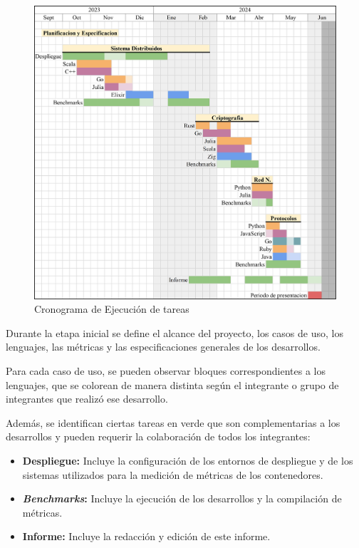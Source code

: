 \documentclass[11pt]{article}
\newcommand{\english}[1]{\textit{#1}}
\begin{document}
\begin{figure}
    \centering
    \includegraphics[width=\textwidth]{resources/cronograma.jpg}
    \caption{Cronograma de Ejecución de tareas}
    \label{tab:anex:cron}
\end{figure}

Durante la etapa inicial se define el alcance del proyecto, los casos de uso, los lenguajes, las métricas y las especificaciones generales de los desarrollos.

Para cada caso de uso, se pueden observar bloques correspondientes a los lenguajes, que se colorean de manera distinta según el integrante o grupo de integrantes que realizó ese desarrollo.

Además, se identifican ciertas tareas en verde que son complementarias a los desarrollos y pueden requerir la colaboración de todos los integrantes:
\begin{itemize}
    \item \textbf{Despliegue:} Incluye la configuración de los entornos de despliegue y de los sistemas utilizados para la medición de métricas de los contenedores.
    \item \textbf{\english{Benchmarks}:} Incluye la ejecución de los desarrollos y la compilación de métricas.
    \item \textbf{Informe:} Incluye la redacción y edición de este informe.
\end{itemize}
\end{document}
